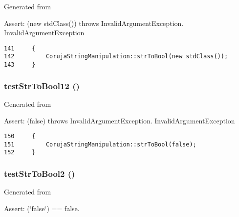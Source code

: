 Generated from \begin{Desc}
\item[Assert:](new stdClass()) throws InvalidArgumentException.  InvalidArgumentException \end{Desc}


\begin{Code}\begin{verbatim}141     {
142         CorujaStringManipulation::strToBool(new stdClass());
143     }
\end{verbatim}
\end{Code}


\hypertarget{class_coruja_string_manipulation_test_cf9704596987fd7a711ff3efaaaaf8c6}{
\subsubsection[{testStrToBool12}]{\setlength{\rightskip}{0pt plus 5cm}testStrToBool12 ()}}
\label{class_coruja_string_manipulation_test_cf9704596987fd7a711ff3efaaaaf8c6}


Generated from \begin{Desc}
\item[Assert:](false) throws InvalidArgumentException.  InvalidArgumentException \end{Desc}


\begin{Code}\begin{verbatim}150     {
151         CorujaStringManipulation::strToBool(false);
152     }
\end{verbatim}
\end{Code}


\hypertarget{class_coruja_string_manipulation_test_e43a3b51d6e27bc7600ded153c1f2f7f}{
\subsubsection[{testStrToBool2}]{\setlength{\rightskip}{0pt plus 5cm}testStrToBool2 ()}}
\label{class_coruja_string_manipulation_test_e43a3b51d6e27bc7600ded153c1f2f7f}


Generated from \begin{Desc}
\item[Assert:](\char`\"{}false\char`\"{}) == false. \end{Desc}


